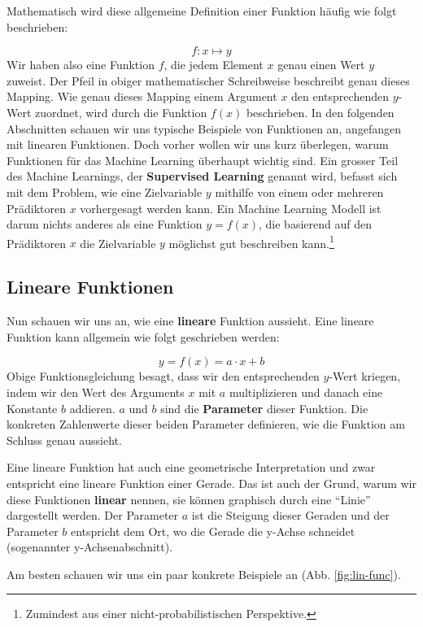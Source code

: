\documentclass[
]{book}
\begin{document}
Mathematisch wird diese allgemeine Definition einer Funktion häufig wie folgt beschrieben:

\[
f : x \mapsto y
\]
Wir haben also eine Funktion \(f\), die jedem Element \(x\) genau einen Wert \(y\) zuweist. Der Pfeil in obiger mathematischer Schreibweise beschreibt genau dieses Mapping. Wie genau dieses Mapping einem Argument \(x\) den entsprechenden \(y\)-Wert zuordnet, wird durch die Funktion \(f(x)\) beschrieben. In den folgenden Abschnitten schauen wir uns typische Beispiele von Funktionen an, angefangen mit linearen Funktionen. Doch vorher wollen wir uns kurz überlegen, warum Funktionen für das Machine Learning überhaupt wichtig sind. Ein grosser Teil des Machine Learnings, der \textbf{Supervised Learning} genannt wird, befasst sich mit dem Problem, wie eine Zielvariable \(y\) mithilfe von einem oder mehreren Prädiktoren \(x\) vorhergesagt werden kann. Ein Machine Learning Modell ist darum nichts anderes als eine Funktion \(y=f(x)\), die basierend auf den Prädiktoren \(x\) die Zielvariable \(y\) möglichst gut beschreiben kann.\footnote{Zumindest aus einer nicht-probabilistischen Perspektive.}

\hypertarget{lineare-funktionen}{%
\subsection{Lineare Funktionen}\label{lineare-funktionen}}

Nun schauen wir uns an, wie eine \textbf{lineare} Funktion aussieht. Eine lineare Funktion kann allgemein wie folgt geschrieben werden:

\[
y = f(x) = a \cdot x + b
\]
Obige Funktionsgleichung besagt, dass wir den entsprechenden \(y\)-Wert kriegen, indem wir den Wert des Arguments \(x\) mit \(a\) multiplizieren und danach eine Konstante \(b\) addieren. \(a\) und \(b\) sind die \textbf{Parameter} dieser Funktion. Die konkreten Zahlenwerte dieser beiden Parameter definieren, wie die Funktion am Schluss genau aussieht.

Eine lineare Funktion hat auch eine geometrische Interpretation und zwar entspricht eine lineare Funktion einer Gerade. Das ist auch der Grund, warum wir diese Funktionen \textbf{linear} nennen, sie können graphisch durch eine ``Linie'' dargestellt werden. Der Parameter \(a\) ist die Steigung dieser Geraden und der Parameter \(b\) entspricht dem Ort, wo die Gerade die y-Achse schneidet (sogenannter y-Achsenabschnitt).

Am besten schauen wir uns ein paar konkrete Beispiele an (Abb. \ref{fig:lin-func}).
\end{document}
